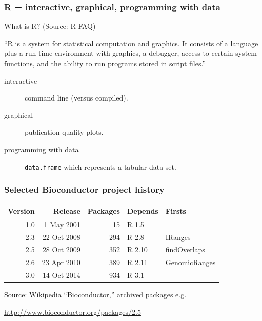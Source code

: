 \documentclass{beamer}
\begin{document}
\begin{frame}
  \frametitle{R = interactive, graphical, programming with data}
  
  What is R? (Source: R-FAQ)

  ``R is a system for statistical computation and graphics. It
  consists of a language plus a run-time environment with graphics, a
  debugger, access to certain system functions, and the ability to run
  programs stored in script files.'' 

  \begin{description}
  \item[interactive] command line (versus compiled).
  \item[graphical] publication-quality plots.
  \item[programming with data] \texttt{data.frame} which represents a
    tabular data set.
  \end{description}
\end{frame}

\begin{frame}
  \frametitle{Selected Bioconductor project history}
  \begin{tabular}{rrrll}
    Version & Release & Packages & Depends & Firsts \\
    \hline
    1.0 & 1 May 2001 & 15 & R 1.5 \\
    2.3 & 22 Oct 2008 & 294 & R 2.8 & IRanges\\
    2.5 & 28 Oct 2009 & 352 & R 2.10 & findOverlaps\\
    2.6 & 23 Apr 2010 & 389 & R 2.11 & GenomicRanges\\
    3.0 & 14 Oct 2014 & 934 & R 3.1
  \end{tabular}

  \vskip 1cm

  Source: Wikipedia ``Bioconductor,'' archived packages e.g.

  \url{http://www.bioconductor.org/packages/2.5}

\end{frame}
\end{document}
